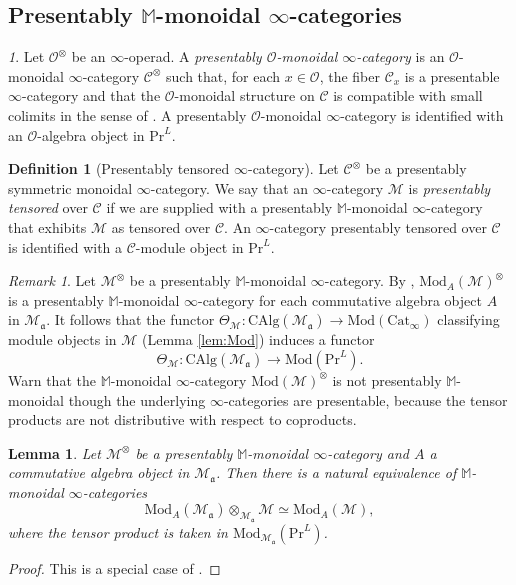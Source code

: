 \documentclass{amsart}
\theoremstyle{plain}
\newtheorem{lemma}[theorem]{Lemma}
\theoremstyle{definition}
\newtheorem{definition}[theorem]{Definition}
\theoremstyle{remark}
\newtheorem{remark}[theorem]{Remark}
\newtheorem{p}[theorem]{}
\numberwithin{equation}{theorem}
\newcommand{\mcal}[1]{\mathcal{#1}}
\newcommand{\mbb}[1]{\mathbb{#1}}
\newcommand{\mfk}[1]{\mathfrak{#1}}
\newcommand{\CAlg}{\mathrm{CAlg}}
\newcommand{\Cat}{\mathrm{Cat}}
\newcommand{\Mod}{\mathrm{Mod}}
\renewcommand{\Pr}{\mathrm{Pr}}
\begin{document}
\subsection{Presentably $\mbb{M}$-monoidal $\infty$-categories}\label{PrM}

\begin{p}
Let $\mcal{O}^\otimes$ be an $\infty$-operad.
A \textit{presentably $\mcal{O}$-monoidal $\infty$-category} is an $\mcal{O}$-monoidal $\infty$-category $\mcal{C}^\otimes$ such that, for each $x\in\mcal{O}$, the fiber $\mcal{C}_x$ is a presentable $\infty$-category and that the $\mcal{O}$-monoidal structure on $\mcal{C}$ is compatible with small colimits in the sense of \cite[3.1.1.18]{HA}.
A presentably $\mcal{O}$-monoidal $\infty$-category is identified with an $\mcal{O}$-algebra object in $\Pr^L$.
\end{p}

\begin{definition}[Presentably tensored $\infty$-category]\label{def:PrM}
Let $\mcal{C}^\otimes$ be a presentably symmetric monoidal $\infty$-category.
We say that an $\infty$-category $\mcal{M}$ is \textit{presentably tensored} over $\mcal{C}$ if we are supplied with a presentably $\mbb{M}$-monoidal $\infty$-category that exhibits $\mcal{M}$ as tensored over $\mcal{C}$. 
An $\infty$-category presentably tensored over $\mcal{C}$ is identified with a $\mcal{C}$-module object in $\Pr^L$.
\end{definition}

\begin{remark}
Let $\mcal{M}^\otimes$ be a presentably $\mbb{M}$-monoidal $\infty$-category.
By \cite[4.8.3.22]{HA}, $\Mod_A(\mcal{M})^\otimes$ is a presentably $\mbb{M}$-monoidal $\infty$-category for each commutative algebra object $A$ in $\mcal{M}_\mfk{a}$.
It follows that the functor $\Theta_\mcal{M}\colon\CAlg(\mcal{M}_\mfk{a})\to\Mod(\Cat_\infty)$ classifying module objects in $\mcal{M}$ (Lemma \ref{lem:Mod}) induces a functor
\[
	\Theta_\mcal{M} \colon \CAlg(\mcal{M}_\mfk{a}) \to \Mod(\Pr^L).
\]
Warn that the $\mbb{M}$-monoidal $\infty$-category $\Mod(\mcal{M})^\otimes$ is not presentably $\mbb{M}$-monoidal though the underlying $\infty$-categories are presentable, because the tensor products are not distributive with respect to coproducts.
\end{remark}

\begin{lemma}\label{lem:PrM}
Let $\mcal{M}^\otimes$ be a presentably $\mbb{M}$-monoidal $\infty$-category and $A$ a commutative algebra object in $\mcal{M}_\mfk{a}$.
Then there is a natural equivalence of $\mbb{M}$-monoidal $\infty$-categories
\[
	\Mod_A(\mcal{M}_\mfk{a})\otimes_{\mcal{M}_\mfk{a}}\mcal{M} \simeq \Mod_A(\mcal{M}),
\]
where the tensor product is taken in $\Mod_{\mcal{M}_\mfk{a}}(\Pr^L)$.
\end{lemma}
\begin{proof}
This is a special case of \cite[4.8.4.6]{HA}.
\end{proof}
\end{document}
